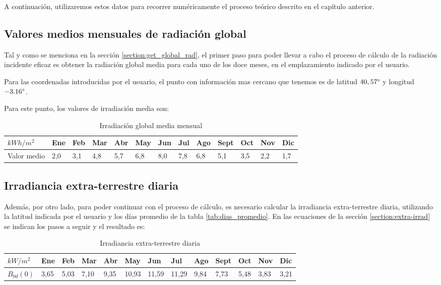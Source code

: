 A continuación, utilizaremos estos datos para recorrer numéricamente el proceso teórico descrito en el capítulo anterior. 

\subsection{Valores medios mensuales de radiación global}

Tal y como se menciona en la sección \ref{section:get_global_rad}, el primer paso para poder llevar a cabo el proceso de cálculo de la radiación incidente eficaz es obtener la radiación global media para cada uno de los doce meses, en el emplazamiento indicado por el usuario.

Para las coordenadas introducidas por el usuario, el punto con información mas cercano que tenemos es de latitud  $40,57 \degree$ y longitud $-3.16 \degree$. 

Para este punto, los valores de irradiación media son:
\begin{table}[ht]
\centering
\begin{tabular}{|l|l|l|l|l|l|l|l|l|l|l|l|l|}
\hline
$kWh/m^2$   & Ene & Feb & Mar & Abr & May & Jun & Jul & Ago & Sept & Oct & Nov & Dic \\ \hline
Valor medio & 2,0 & 3,1 & 4,8 & 5,7 & 6,8 & 8,0 & 7,8 & 6,8 & 5,1  & 3,5 & 2,2 & 1,7 \\ \hline
\end{tabular}
\label{tab:mean_values_monthly}
\caption{Irradiación global media mensual}
\end{table}

\subsection{Irradiancia extra-terrestre diaria}

Además, por otro lado, para poder continuar con el proceso de cálculo, es necesario calcular la irradiancia extra-terrestre diaria, utilizando la latitud indicada por el usuario y los días promedio de la tabla \ref{tab:dias_promedio}.
En las ecuaciones de la sección \ref{section:extra-irrad} se indican los pasos a seguir y el resultado es:
\begin{table}[ht]
\centering
\begin{tabular}{|l|l|l|l|l|l|l|l|l|l|l|l|l|}
\hline
$kW/m^2$   & Ene & Feb & Mar & Abr & May & Jun & Jul & Ago & Sept & Oct & Nov & Dic \\ \hline
$B_{0d}(0)$ & 3,65 & 5,03 & 7,10 & 9,35 & 10,93 & 11,59 & 11,29 & 9,84 & 7,73 & 5,48  & 3,83 & 3,21 \\ \hline
\end{tabular}
\label{tab:extra_irrad_values}
\caption{Irradiancia extra-terrestre diaria}
\end{table}

